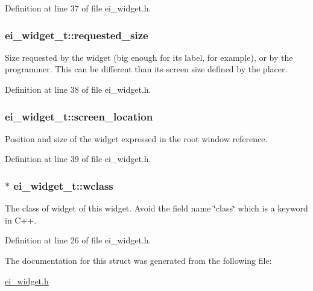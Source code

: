 Definition at line 37 of file ei\-\_\-widget.\-h.

\hypertarget{structei__widget__t_ae82b19958b3ec72a855986dffb9b92ea}{
\subsubsection[{requested\-\_\-size}]{ ei\-\_\-widget\-\_\-t\-::requested\-\_\-size}}\label{structei__widget__t_ae82b19958b3ec72a855986dffb9b92ea}


Size requested by the widget (big enough for its label, for example), or by the programmer. This can be different than its screen size defined by the placer. 



Definition at line 38 of file ei\-\_\-widget.\-h.

\hypertarget{structei__widget__t_ad139e1541329b54e0b4c8d746e14b204}{
\subsubsection[{screen\-\_\-location}]{ ei\-\_\-widget\-\_\-t\-::screen\-\_\-location}}\label{structei__widget__t_ad139e1541329b54e0b4c8d746e14b204}


Position and size of the widget expressed in the root window reference. 



Definition at line 39 of file ei\-\_\-widget.\-h.

\hypertarget{structei__widget__t_a429e970e1d266252df4dbe55296b9f70}{
\subsubsection[{wclass}]{$\ast$ ei\-\_\-widget\-\_\-t\-::wclass}}\label{structei__widget__t_a429e970e1d266252df4dbe55296b9f70}


The class of widget of this widget. Avoid the field name \char`\"{}class\char`\"{} which is a keyword in C++. 



Definition at line 26 of file ei\-\_\-widget.\-h.



The documentation for this struct was generated from the following file\-:\begin{DoxyCompactItemize}
\item 
\hyperlink{ei__widget_8h}{ei\-\_\-widget.\-h}\end{DoxyCompactItemize}
